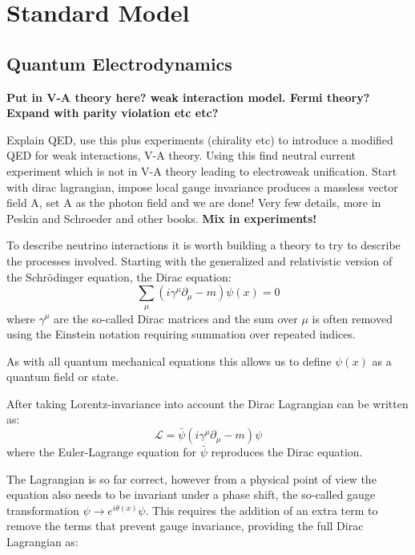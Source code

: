 \section{Standard Model}\label{section:SM}

\subsection{Quantum Electrodynamics}

\textbf{Put in V-A theory here? weak interaction model. Fermi theory?}
\textbf{Expand with parity violation etc etc?}

Explain QED, use this plus experiments (chirality etc) to introduce a modified QED for weak interactions, V-A theory. Using this find neutral current experiment which is not in V-A theory leading to electroweak unification.
Start with dirac lagrangian, impose local gauge invariance produces a massless vector field A, set A as the photon field and we are done! 
Very few details, more in Peskin and Schroeder and other books.
\textbf{Mix in experiments!}
\fi

To describe neutrino interactions it is worth building a theory to try to describe the processes involved. Starting with the generalized and relativistic version of the Schr\"{o}dinger equation, the Dirac equation:
\begin{equation}
\sum_\mu (i\gamma^\mu \partial_\mu - m)\psi(x) = 0
\end{equation}
where $\gamma^\mu$ are the so-called Dirac matrices and the sum over $\mu$ is often removed using the Einstein notation requiring summation over repeated indices.

As with all quantum mechanical equations this allows us to define $\psi(x)$ as a quantum field or state.

After taking Lorentz-invariance into account the Dirac Lagrangian can be written as:
\begin{equation}
\mathcal{L} = \bar{\psi}(i\gamma^\mu\partial_\mu-m)\psi
\end{equation}
where the Euler-Lagrange equation for $\bar{\psi}$ reproduces the Dirac equation.

The Lagrangian is so far correct, however from a physical point of view the equation also needs to be invariant under a phase shift, the so-called gauge transformation $\psi \rightarrow e^{i\theta(x)}\psi$. This requires the addition of an extra term to remove the terms that prevent gauge invariance, providing the full Dirac Lagrangian as:

